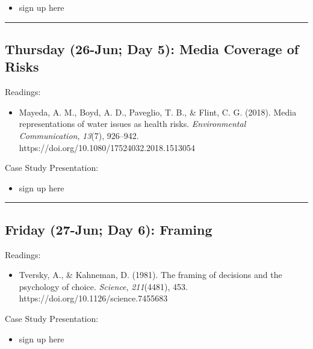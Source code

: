 \documentclass[
  letterpaper,
]{article}
\providecommand{\tightlist}{%
  \setlength{\itemsep}{0pt}\setlength{\parskip}{0pt}}\usepackage{longtable,booktabs,array}
\begin{document}
\begin{itemize}
\tightlist
\item
  sign up here
\end{itemize}

\begin{center}\rule{0.5\linewidth}{0.5pt}\end{center}

\hypertarget{thursday-26-jun-day-5-media-coverage-of-risks}{%
\subsection{Thursday (26-Jun; Day 5): Media Coverage of
Risks}\label{thursday-26-jun-day-5-media-coverage-of-risks}}

Readings:

\begin{itemize}
\tightlist
\item
  Mayeda, A. M., Boyd, A. D., Paveglio, T. B., \& Flint, C. G. (2018).
  Media representations of water issues as health risks.
  \emph{Environmental Communication}, \emph{13}(7), 926--942.
  https://doi.org/10.1080/17524032.2018.1513054
\end{itemize}

Case Study Presentation:

\begin{itemize}
\tightlist
\item
  sign up here
\end{itemize}

\begin{center}\rule{0.5\linewidth}{0.5pt}\end{center}

\hypertarget{friday-27-jun-day-6-framing}{%
\subsection{Friday (27-Jun; Day 6):
Framing}\label{friday-27-jun-day-6-framing}}

Readings:

\begin{itemize}
\tightlist
\item
  Tversky, A., \& Kahneman, D. (1981). The framing of decisions and the
  psychology of choice. \emph{Science}, \emph{211}(4481), 453.
  https://doi.org/10.1126/science.7455683
\end{itemize}

Case Study Presentation:

\begin{itemize}
\tightlist
\item
  sign up here
\end{itemize}
\end{document}

